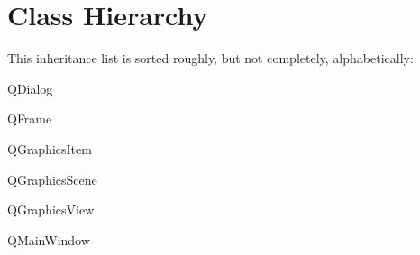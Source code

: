 \section{Class Hierarchy}
This inheritance list is sorted roughly, but not completely, alphabetically\+:\begin{DoxyCompactList}
\item {}
\item {}
\item Q\+Dialog\begin{DoxyCompactList}
\item {}
\end{DoxyCompactList}
\item Q\+Frame\begin{DoxyCompactList}
\item {}
\item {}
\end{DoxyCompactList}
\item Q\+Graphics\+Item\begin{DoxyCompactList}
\item {}
\begin{DoxyCompactList}
\item {}
\end{DoxyCompactList}
\end{DoxyCompactList}
\item Q\+Graphics\+Scene\begin{DoxyCompactList}
\item {}
\end{DoxyCompactList}
\item Q\+Graphics\+View\begin{DoxyCompactList}
\item {}
\end{DoxyCompactList}
\item Q\+Main\+Window\begin{DoxyCompactList}
\item {}

\end{DoxyCompactList}
\end{DoxyCompactList}
